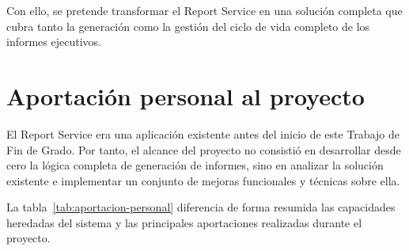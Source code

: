 \documentclass[11pt,a4paper,titlepage,oneside]{report}
\begin{document}
Con ello, se pretende transformar el Report Service en una solución completa que cubra tanto la generación como la gestión del ciclo de vida completo de los informes ejecutivos.

\section{Aportación personal al proyecto}

El Report Service era una aplicación existente antes del inicio de este
Trabajo de Fin de Grado. Por tanto, el alcance del proyecto no consistió en
desarrollar desde cero la lógica completa de generación de informes, sino en
analizar la solución existente e implementar un conjunto de mejoras
funcionales y técnicas sobre ella.

La tabla~\ref{tab:aportacion-personal} diferencia de forma resumida las
capacidades heredadas del sistema y las principales aportaciones realizadas
durante el proyecto.
\end{document}
